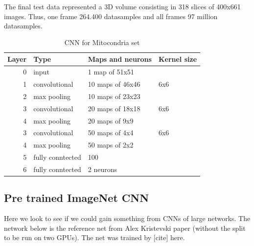 \documentclass{article} %
\begin{document}
The final test data represented a 3D volume consisting in 318 slices of  400x661 images. Thus, one frame 264.400 datasamples and 
all frames 97 million datasamples.

\begin{table}
\centering
\begin{tabular}{@{}rlll@{}}\toprule
Layer & Type & Maps and neurons& Kernel size \\ \midrule
0 & input & 1 map of 51x51 &\\
1& convolutional & 10 maps of 46x46 & 6x6\\
2 & max pooling & 10 maps of 23x23 &  \\
3 & convolutional & 20 maps of 18x18& 6x6 \\
4 & max pooling & 20 maps of 9x9& \\ 
3 & convolutional & 50 maps of 4x4& 6x6 \\
4 & max pooling & 50 maps of 2x2& \\ 
5 & fully conntected& 100 & \\
6 & fully conntected & 2 neurons & \\ \bottomrule
\end{tabular}
\caption{CNN for Mitocondria set}
\label{fig:CNN3}
\end{table}

\subsection{Pre trained ImageNet CNN}
Here we look to see if we could gain something from CNNs of large networks. The network below is the reference net from Alex Kristevski paper (without the split to be run on two GPUs). The net was trained by [cite] here. 
\end{document}
